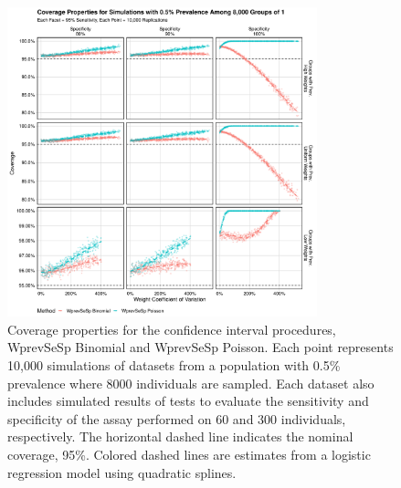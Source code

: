 \begin{figure}
\centering
\includegraphics[width=0.8\textwidth]{imperfect_coverage_8000_groups_0_005_prev}
\caption{Coverage properties for the confidence interval procedures, WprevSeSp Binomial and WprevSeSp Poisson.
Each point represents 10,000 simulations of datasets from a population with 0.5\% prevalence where 8000 individuals are sampled.
Each dataset also includes simulated results of tests to evaluate the sensitivity and specificity of the assay performed on 60 and 300 individuals, respectively.
The horizontal dashed line indicates the nominal coverage, 95\%.
Colored dashed lines are estimates from a logistic regression model using quadratic splines.}
\label{ch_3:fig:imperfect_coverage_8000_groups_0_005_prev}
\end{figure}

